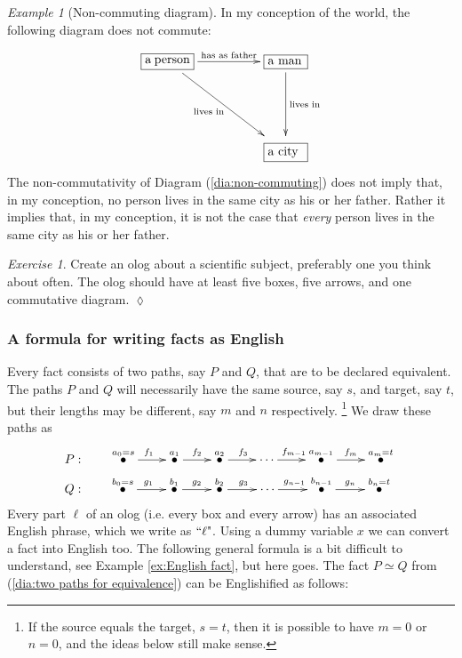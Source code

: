 \documentclass{book}
\def\tn{\textnormal}
\newcommand{\qt}[1]{\tn{``}#1\tn{"}}
\def\hsp{\hspace{.3in}}
\newcommand{\LMO}[1]{\stackrel{#1}{\bullet}}
\newcommand{\LA}[2]{\ar[#1]^-{\tn {#2}}}
\newcommand{\LAL}[2]{\ar[#1]_-{\tn {#2}}}
\newcommand{\obox}[3]{\stackrel{#1}{\fbox{\parbox{#2}{#3}}}}
\theoremstyle{remark}
\newtheorem{example}[subsubsection]{Example}
\newtheorem{exc}[subsubsection]{Exercise}
\newenvironment{exercise}{\begin{exc}}{\hspace*{\fill}$\lozenge$\end{exc}}
\theoremstyle{definition}
\begin{document}
\begin{example}[Non-commuting diagram]

In my conception of the world, the following diagram does not commute:
\begin{align}\label{dia:non-commuting}
\xymatrixnocompile@=50pt{\obox{}{.5in}{a person}\LA{r}{has as father}\LAL{dr}{lives in}&\obox{}{.4in}{a man}\LA{d}{lives in}\\&\obox{}{.4in}{a city}}
\end{align}
The non-commutativity of Diagram (\ref{dia:non-commuting}) does not imply that, in my conception, no person lives in the same city as his or her father. Rather it implies that, in my conception, it is not the case that {\em every} person lives in the same city as his or her father.

\end{example}

\begin{exercise}
Create an olog about a scientific subject, preferably one you think about often. The olog should have at least five boxes, five arrows, and one commutative diagram. 
\end{exercise}


\subsubsection{A formula for writing facts as English}

Every fact consists of two paths, say $P$ and $Q$, that are to be declared equivalent. The paths $P$ and $Q$ will necessarily have the same source, say $s$, and target, say $t$, but their lengths may be different, say $m$ and $n$ respectively.
\footnote{If the source equals the target, $s=t$, then it is possible  to have $m=0$ or $n=0$, and the ideas below still make sense.} 
We draw these paths as 
\begin{align}\label{dia:two paths for equivalence}
P:&\hsp\xymatrix@=22pt{\LMO{a_0=s}\ar[r]^{f_1}&\LMO{a_1}\ar[r]^{f_2}&\LMO{a_2}\ar[r]^{f_3}&\cdots\ar[r]^{f_{m-1}}&\LMO{a_{m-1}}\ar[r]^{f_m}&\LMO{a_m=t}}\\\nonumber
Q:&\hsp\xymatrix@=23pt{\LMO{b_0=s}\ar[r]^{g_1}&\LMO{b_1}\ar[r]^{g_2}&\LMO{b_2}\ar[r]^{g_3}&\cdots\ar[r]^{g_{n-1}}&\LMO{b_{n-1}}\ar[r]^{g_n}&\LMO{b_n=t}}
\end{align}
Every part $\ell$ of an olog (i.e. every box and every arrow) has an associated English phrase, which we write as $\qt{\ell}$. Using a dummy variable $x$ we can convert a fact into English too. The following general formula is a bit difficult to understand, see Example \ref{ex:English fact}, but here goes. The fact $P\simeq Q$ from (\ref{dia:two paths for equivalence}) can be Englishified as follows:
\end{document}
